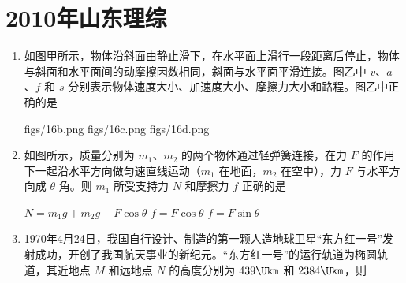 \documentclass[\gkver]{gaokaozhenti}
\begin{document}
\chapter{2010年山东理综}

\begin{enumerate}
\item
如图甲所示，物体沿斜面由静止滑下，在水平面上滑行一段距离后停止，物体与斜面和水平面间的动摩擦因数相同，斜面与水平面平滑连接。图乙中 $v$、$a$、$f$ 和 $s$ 分别表示物体速度大小、加速度大小、摩擦力大小和路程。图乙中正确的是


{figs/16b.png}
{figs/16c.png}
{figs/16d.png}


\item
如图所示，质量分别为 $m_{1}$、$m_{2}$ 的两个物体通过轻弹簧连接，在力 $F$ 的作用下一起沿水平方向做匀速直线运动（$m_{1}$ 在地面，$m_{2}$ 在空中），力 $F$ 与水平方向成 $\theta$ 角。则 $m_{1}$ 所受支持力 $N$ 和摩擦力 $f$ 正确的是


{$N=m_{1}g+m_{2}g-F\cos\theta$}
{$f=F\cos\theta$}
{$f=F\sin\theta$}


\item
1970年4月24日，我国自行设计、制造的第一颗人造地球卫星“东方红一号”发射成功，开创了我国航天事业的新纪元。“东方红一号”的运行轨道为椭圆轨道，其近地点 $M$ 和远地点 $N$ 的高度分别为 $439\Ukm$ 和 $2384\Ukm$，则


\end{enumerate}
\end{document}
